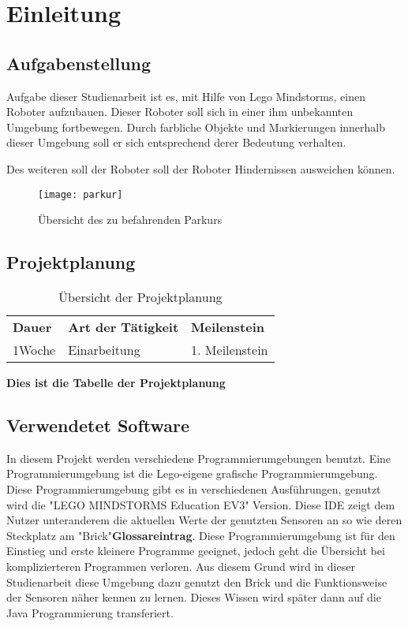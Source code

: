 \chapter{Einleitung}
\section{Aufgabenstellung}

Aufgabe dieser Studienarbeit ist es, mit Hilfe von Lego Mindstorms, einen Roboter aufzubauen. Dieser Roboter soll sich in einer ihm unbekannten Umgebung fortbewegen. Durch farbliche Objekte und Markierungen innerhalb dieser Umgebung soll er sich entsprechend derer Bedeutung verhalten. 

Des weiteren soll der Roboter soll der Roboter Hindernissen ausweichen können. 
\begin{figure}[htb]
\centering
\texttt{[image: parkur]}
\caption{Übersicht des zu befahrenden Parkurs}
\label{fig:Fahrstrecke}
\end{figure}

\section{Projektplanung}
\begin{table}[htp]
\centering
\begin{tabularx}{\textwidth}{|X|X|X|}
\cline{1-3}
  \textbf{ Dauer}&\textbf{Art der Tätigkeit}&\textbf{Meilenstein} \\\cline{1-3}
  1Woche& Einarbeitung & 1. Meilenstein\\\cline{1-3}
\end{tabularx}
\caption{Übersicht der Projektplanung}
\label{tab:projektplaung}
\end{table}
\textbf{Dies ist die Tabelle der Projektplanung}

\section{Verwendetet Software}
In diesem Projekt werden verschiedene Programmierumgebungen benutzt. Eine Programmierumgebung ist die Lego-eigene grafische Programmierumgebung. Diese Programmierumgebung gibt es in verschiedenen Ausführungen, genutzt wird die "LEGO MINDSTORMS Education EV3" Version. Diese IDE zeigt dem Nutzer unteranderem die aktuellen Werte der genutzten Sensoren an so wie deren Steckplatz am "Brick"\textbf{Glossareintrag}. Diese Programmierumgebung ist für den Einstieg und erste kleinere Programme geeignet, jedoch geht die Übersicht bei komplizierteren Programmen verloren. Aus diesem Grund wird in dieser Studienarbeit diese Umgebung dazu genutzt den Brick und die Funktionsweise der Sensoren näher kennen zu lernen. Dieses Wissen wird später dann auf die Java Programmierung transferiert.

